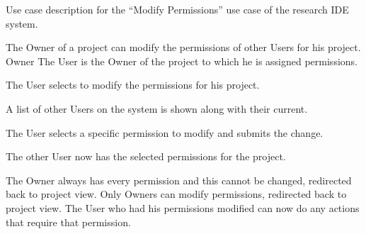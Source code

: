 \documentclass[document.tex]{subfiles}
\begin{document}
\begin{table}
  \centering
  \caption{Use case description for the ``Modify Permissions'' use case of the research IDE system.}
  \label{tbl:use-case-modify-permissions}

  \begin{usecase}
    The Owner of a project can modify the permissions of other Users for his project.
    Owner
    The User is the Owner of the project to which he is assigned permissions.
    \ucnormal
    \begin{ucenum}
      \item The User selects to modify the permissions for his project.
      \item A list of other Users on the system is shown along with their current.
      \item The User selects a specific permission to modify and submits the change.
      \item The other User now has the selected permissions for the project.
    \end{ucenum}
    The Owner always has every permission and this cannot be changed, redirected back to project view.
    Only Owners can modify permissions, redirected back to project view.
    The User who had his permissions modified can now do any actions that require that permission.
  \end{usecase}
\end{table}
\end{document}
